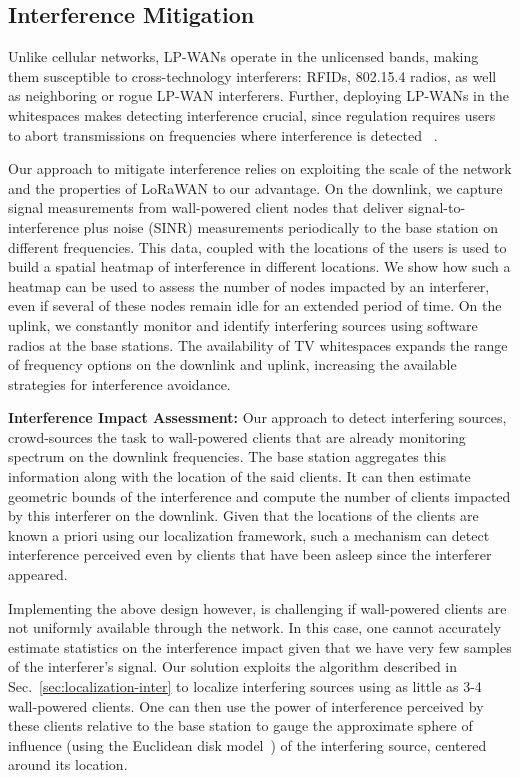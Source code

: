 \subsection{Interference Mitigation} \label{sec:interferemit}
Unlike cellular networks, LP-WANs operate in the unlicensed bands, making them susceptible to cross-technology interferers: RFIDs, 802.15.4 radios, as well as neighboring or rogue LP-WAN interferers. Further, deploying LP-WANs in the whitespaces makes detecting interference crucial, since regulation requires users to abort transmissions on frequencies where interference is detected ~\cite{FCC_Whitespaces}. 

Our approach to mitigate interference relies on exploiting the scale of the network and the properties of LoRaWAN to our advantage. On the downlink, we capture signal measurements from wall-powered client nodes that deliver signal-to-interference plus noise (SINR) measurements periodically to the base station on different frequencies. This data, coupled with the locations of the users is used to build a spatial heatmap of interference in different locations. We show how such a heatmap can be used to assess the number of nodes impacted by an interferer, even if several of these nodes remain idle for an extended period of time. On the uplink, we constantly monitor and identify interfering sources using software radios at the base stations. The availability of TV whitespaces expands the range of frequency options on the downlink and uplink, increasing the available strategies for interference avoidance.\\\vspace*{-0.1in}  

\noindent \textbf{Interference Impact Assessment: } Our approach to detect interfering sources, crowd-sources the task to wall-powered clients that are already monitoring spectrum on the downlink frequencies. The base station aggregates this information along with the location of the said clients. It can then estimate geometric bounds of the interference and compute the number of clients impacted by this interferer on the downlink. Given that the locations of the clients are known a priori using our localization framework, such a mechanism can detect interference perceived even by clients that have been asleep since the interferer appeared. 

Implementing the above design however, is challenging if wall-powered clients are not uniformly available through the network. In this case, one cannot accurately estimate statistics on the interference impact given that we have very few samples of the interferer's signal. Our solution exploits the algorithm described in Sec.~\ref{sec:localization-inter} to localize interfering sources using as little as 3-4 wall-powered clients. One can then use the power of interference perceived by these clients relative to the base station to gauge the approximate sphere of influence (using the Euclidean disk model~\cite{chen2011implications}) of the interfering source, centered around its location. \\\vspace*{-0.1in}  

